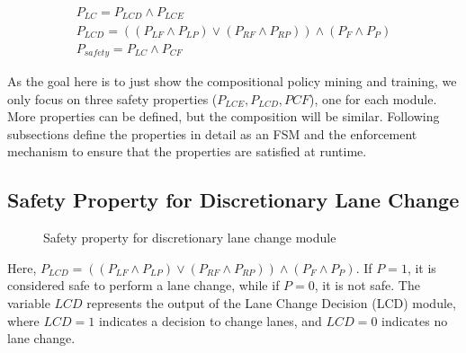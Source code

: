 \begin{equation}
  \begin{aligned}
    P_{LC} = P_{LCD} \land P_{LCE} \\
    P_{LCD} = ((P_{LF} \land P_{LP}) \lor (P_{RF} \land P_{RP})) \land (P_{F} \land P_{P}) \\
    P_{safety} = P_{LC} \land P_{CF}
  \end{aligned}
\end{equation}

As the goal here is to just show the compositional policy mining and training, we only focus on three safety properties ($P_{LCE}, P_{LCD}, P{CF}$), one for each module. More properties can be defined, but the composition will be similar. Following subsections define the properties in detail as an FSM and the enforcement mechanism to ensure that the properties are satisfied at runtime.

\subsection{Safety Property for Discretionary Lane Change}

\begin{figure}[htbp]
    \centering

    \caption{Safety property for discretionary lane change module}
    \label{fig:lcd_property}
\end{figure}
Here, $ P_{LCD} = ((P_{LF} \land P_{LP}) \lor (P_{RF} \land P_{RP})) \land (P_{F} \land P_{P}) $. If $P=1$, it is considered safe to perform a lane change, while if $P=0$, it is not safe. The variable $LCD$ represents the output of the Lane Change Decision (LCD) module, where $LCD=1$ indicates a decision to change lanes, and $LCD=0$ indicates no lane change.

